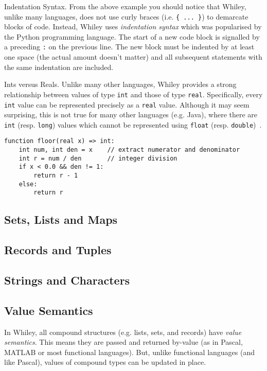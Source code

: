 \begin{insight}{Indentation Syntax.}
  From the above example you should notice that Whiley, unlike many
  languages, does not use curly braces (i.e. \verb+{ ... }+) to
  demarcate blocks of code.  Instead, Whiley uses {\em indentation
    syntax} which was popularised by the Python programming language.
  The start of a new code block is signalled by a preceding \verb+:+
  on the previous line.  The new block must be indented by at least
  one space (the actual amount doesn't matter) and all subsequent
  statements with the same indentation are included.
\end{insight}

\begin{insight}{Ints versus Reals.}
Unlike many other languages, Whiley provides a strong relationship
between values of type \lstinline{int} and those of type
\lstinline{real}.  Specifically, every \lstinline{int} value can be
represented precisely as a \lstinline{real} value.  Although it may
seem surprising, this is not true for many other languages
(e.g. Java), where there are \lstinline{int} (resp. \lstinline{long})
values which cannot be represented using \lstinline{float}
(resp. \lstinline{double})~\cite[\S5.1.2]{GJSB05}.
\end{insight}

\begin{lstlisting}
function floor(real x) => int:
    int num, int den = x    // extract numerator and denominator
    int r = num / den       // integer division
    if x < 0.0 && den != 1: 	 
        return r - 1 
    else:
        return r 
\end{lstlisting}

\subsection{Sets, Lists and Maps}

\subsection{Records and Tuples}

\subsection{Strings and Characters}

\subsection{Value Semantics}
\label{value_semantics}
In Whiley, all compound structures (e.g. lists, sets, and records)
have {\em value semantics}.  This means they are passed and returned
by-value (as in Pascal, MATLAB or most functional languages).  But, unlike
functional languages (and like Pascal), values of compound types can
be updated in place.

